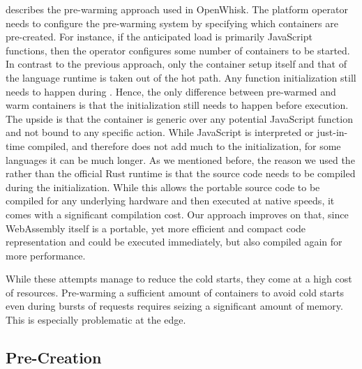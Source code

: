 \citeauthor{Thoemmes2017} describes the pre-warming approach used in OpenWhisk. The platform operator needs to configure the pre-warming system by specifying which containers are pre-created. For instance, if the anticipated load is primarily JavaScript functions, then the operator configures some number of  containers to be started. In contrast to the previous approach, only the container setup itself and that of the language runtime is taken out of the hot path. Any function initialization still needs to happen during . Hence, the only difference between pre-warmed and warm containers is that the initialization still needs to happen before execution. The upside is that the container is generic over any potential JavaScript function and not bound to any specific action.
While JavaScript is interpreted or just-in-time compiled, and therefore does not add much to the initialization, for some languages it can be much longer. As we mentioned before, the reason we used the  rather than the official Rust runtime is that the source code needs to be compiled during the initialization. While this allows the portable source code to be compiled for any underlying hardware and then executed at native speeds, it comes with a significant compilation cost. Our approach improves on that, since WebAssembly itself is a portable, yet more efficient and compact code representation and could be executed immediately, but also compiled again for more performance.

While these attempts manage to reduce the cold starts, they come at a high cost of resources. Pre-warming a sufficient amount of containers to avoid cold starts even during bursts of requests requires seizing a significant amount of memory. This is especially problematic at the edge.

\subsection{Pre-Creation}

